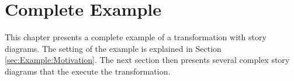 \chapter{Complete Example}

This chapter presents a complete example of a transformation with story diagrams. The setting of the example is explained in Section \ref{sec:Example:Motivation}. The next section then presents several complex story diagrams that the execute the transformation.

%
%
%
%
%
%
%
%
%
